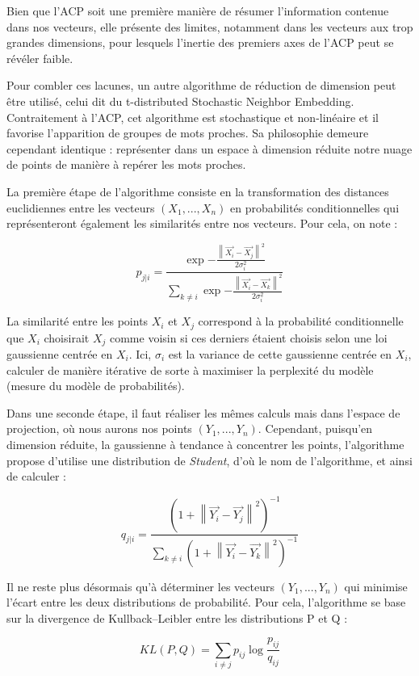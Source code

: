 \documentclass[11pt,french,french]{article}
\begin{document}
Bien que l'ACP soit une première manière de résumer l'information
contenue dans nos vecteurs, elle présente des limites, notamment dans
les vecteurs aux trop grandes dimensions, pour lesquels l'inertie des
premiers axes de l'ACP peut se révéler faible.

Pour combler ces lacunes, un autre algorithme de réduction de dimension
peut être utilisé, celui dit du t-distributed Stochastic Neighbor
Embedding. Contraitement à l'ACP, cet algorithme est stochastique et
non-linéaire et il favorise l'apparition de groupes de mots proches. Sa
philosophie demeure cependant identique : représenter dans un espace à
dimension réduite notre nuage de points de manière à repérer les mots
proches.

La première étape de l'algorithme consiste en la transformation des
distances euclidiennes entre les vecteurs \((X_1,...,X_n)\) en
probabilités conditionnelles qui représenteront également les
similarités entre nos vecteurs. Pour cela, on note :

\[ p_{j|i} = \frac{\exp{-\frac{\left\| \vec{X_i} - \vec{X_j}  \right\|^2}{2\sigma_i^2}}}{\sum_{k \neq i}{\exp{-\frac{\left\| \vec{X_i} - \vec{X_k}  \right\|^2}{2\sigma_i^2}}}}\]

La similarité entre les points \(X_i\) et \(X_j\) correspond à la
probabilité conditionnelle que \(X_i\) choisirait \(X_j\) comme voisin
si ces derniers étaient choisis selon une loi gaussienne centrée en
\(X_i\). Ici, \(\sigma_i\) est la variance de cette gaussienne centrée
en \(X_i\), calculer de manière itérative de sorte à maximiser la
perplexité du modèle (mesure du modèle de probabilités).

Dans une seconde étape, il faut réaliser les mêmes calculs mais dans
l'espace de projection, où nous aurons nos points \((Y_1,..., Y_n)\).
Cependant, puisqu'en dimension réduite, la gaussienne à tendance à
concentrer les points, l'algorithme propose d'utilise une distribution
de \emph{Student}, d'où le nom de l'algorithme, et ainsi de calculer :

\[ q_{j|i} = \frac{(1+\left\| \vec{Y_i} - \vec{Y_j}  \right\|^2)^{-1}}{\sum_{k \neq i}{(1+\left\| \vec{Y_i} - \vec{Y_k}  \right\|^2)^{-1}}}\]

Il ne reste plus désormais qu'à déterminer les vecteurs
\((Y_1,...,Y_n)\) qui minimise l'écart entre les deux distributions de
probabilité. Pour cela, l'algorithme se base sur la divergence de
Kullback--Leibler entre les distributions P et Q :

\[KL(P,Q) = \sum_{i \neq j} { p_{ij} \log{\frac{p_{ij}}{q_{ij}}}}\]
\end{document}
